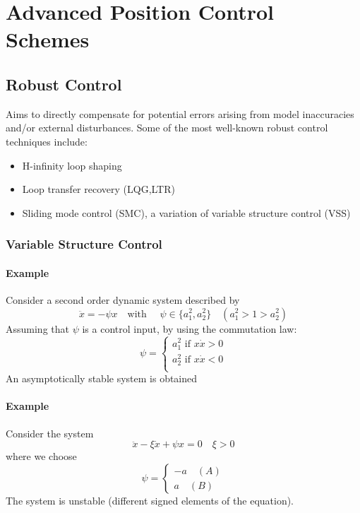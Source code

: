 \documentclass{book}
\begin{document}
\chapter{Advanced Position Control Schemes}









\section{Robust Control}
Aims to directly compensate for potential errors arising from model inaccuracies and/or external disturbances. Some of the most well-known robust control techniques include:
\begin{itemize}
    \item H-infinity loop shaping
    \item Loop transfer recovery (LQG,LTR)
    \item Sliding mode control (SMC), a variation of variable structure control (VSS)
\end{itemize}
\subsection{Variable Structure Control}
\subsubsection{Example}
Consider a second order dynamic system described by 
\[
    \ddot{x}=-\psi x \quad \text{with } \quad \psi\in \{a_1^2,a_2^2\} \quad (a_1^2>1>a_2^2)
\]
Assuming that $\psi$ is a control input, by using the commutation law:
\[
    \psi=\begin{cases}
        a_1^2 \text{ if } x\dot{x}>0\\
        a_2^2 \text{ if } x\dot{x}<0\\
    \end{cases}
\]
An asymptotically stable system is obtained
\subsubsection{Example}
Consider the system
\[
    \ddot{x}-\xi \dot{x}+\psi x = 0 \quad \xi >0 
\]
where we choose
\[
    \psi = \begin{cases}
        -a \quad (A)\\
        a \quad (B)
    \end{cases}
\]
The system is unstable (different signed elements of the equation).
\end{document}
